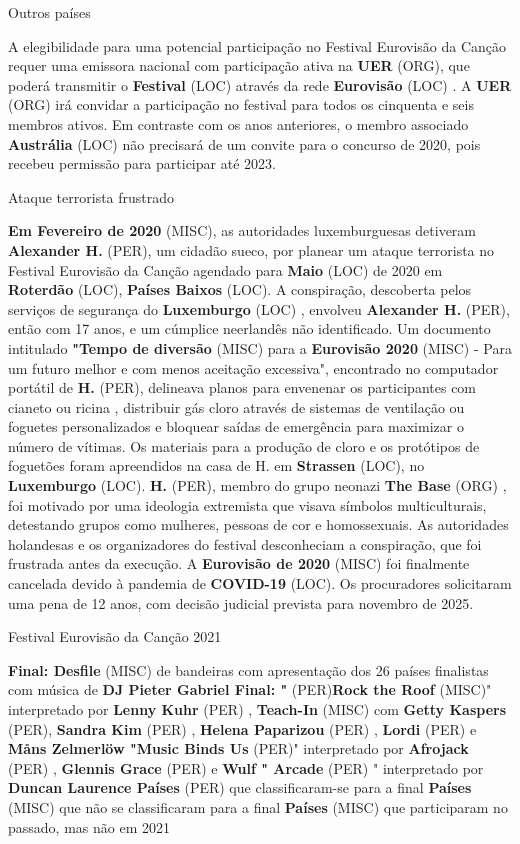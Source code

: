 \documentclass[12pt,a4paper]{article}
\begin{document}
Outros países

A elegibilidade para uma potencial participação no Festival Eurovisão da Canção requer uma emissora nacional com participação ativa na \textbf{UER} (ORG), que poderá transmitir o \textbf{Festival} (LOC) através da rede \textbf{Eurovisão} (LOC) . A \textbf{UER} (ORG) irá convidar a participação no festival para todos os cinquenta e seis membros ativos. Em contraste com os anos anteriores, o membro associado \textbf{Austrália} (LOC) não precisará de um convite para o concurso de 2020, pois recebeu permissão para participar até 2023.



Ataque terrorista frustrado

\textbf{Em Fevereiro de 2020} (MISC), as autoridades luxemburguesas detiveram \textbf{Alexander H.} (PER), um cidadão sueco, por planear um ataque terrorista no Festival Eurovisão da Canção agendado para \textbf{Maio} (LOC) de 2020 em \textbf{Roterdão} (LOC), \textbf{Países Baixos} (LOC). A conspiração, descoberta pelos serviços de segurança do \textbf{Luxemburgo} (LOC) , envolveu \textbf{Alexander H.} (PER), então com 17 anos, e um cúmplice neerlandês não identificado. Um documento intitulado \textbf{"Tempo de diversão} (MISC) para a \textbf{Eurovisão 2020} (MISC) - Para um futuro melhor e com menos aceitação excessiva", encontrado no computador portátil de \textbf{H.} (PER), delineava planos para envenenar os participantes com cianeto ou ricina , distribuir gás cloro através de sistemas de ventilação ou foguetes personalizados e bloquear saídas de emergência para maximizar o número de vítimas. Os materiais para a produção de cloro e os protótipos de foguetões foram apreendidos na casa de H. em \textbf{Strassen} (LOC), no \textbf{Luxemburgo} (LOC). \textbf{H.} (PER), membro do grupo neonazi \textbf{The Base} (ORG) , foi motivado por uma ideologia extremista que visava símbolos multiculturais, detestando grupos como mulheres, pessoas de cor e homossexuais. As autoridades holandesas e os organizadores do festival desconheciam a conspiração, que foi frustrada antes da execução. A \textbf{Eurovisão de 2020} (MISC) foi finalmente cancelada devido à pandemia de \textbf{COVID-19} (LOC). Os procuradores solicitaram uma pena de 12 anos, com decisão judicial prevista para novembro de 2025.



Festival Eurovisão da Canção 2021



\textbf{Final: Desfile} (MISC) de bandeiras com apresentação dos 26 países finalistas com música de \textbf{DJ Pieter Gabriel Final: "} (PER)\textbf{Rock the Roof} (MISC)" interpretado por \textbf{Lenny Kuhr} (PER) , \textbf{Teach-In} (MISC) com \textbf{Getty Kaspers} (PER), \textbf{Sandra Kim} (PER) , \textbf{Helena Paparizou} (PER) , \textbf{Lordi} (PER) e \textbf{Måns Zelmerlöw "Music Binds Us} (PER)" interpretado por \textbf{Afrojack} (PER) , \textbf{Glennis Grace} (PER) e \textbf{Wulf " Arcade} (PER) " interpretado por \textbf{Duncan Laurence Países} (PER) que classificaram-se para a final \textbf{Países} (MISC) que não se classificaram para a final \textbf{Países} (MISC) que participaram no passado, mas não em 2021
\end{document}
